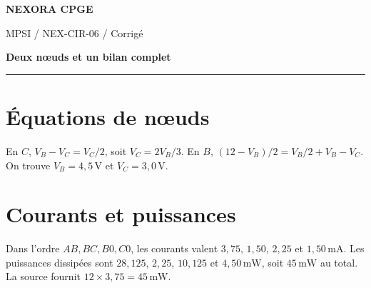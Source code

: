 \documentclass[11pt,a4paper]{article}
\begin{document}
{\small\bfseries\color{nexorablue} NEXORA CPGE}\par
{\small MPSI / NEX-CIR-06 / Corrigé}\par
{\LARGE\bfseries Deux nœuds et un bilan complet}\par
\vspace{0.25em}\hrule\vspace{0.6em}

\section*{Équations de nœuds}
En $C$, $V_B-V_C=V_C/2$, soit $V_C=2V_B/3$. En $B$, $(12-V_B)/2=V_B/2+V_B-V_C$. On trouve $V_B=4{,}5\,\mathrm V$ et $V_C=3{,}0\,\mathrm V$.

\section*{Courants et puissances}
Dans l’ordre $AB,BC,B0,C0$, les courants valent $3{,}75$, $1{,}50$, $2{,}25$ et $1{,}50\,\mathrm{mA}$. Les puissances dissipées sont $28{,}125$, $2{,}25$, $10{,}125$ et $4{,}50\,\mathrm{mW}$, soit $45\,\mathrm{mW}$ au total. La source fournit $12\times3{,}75=45\,\mathrm{mW}$.
\end{document}
